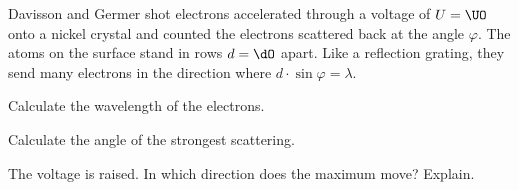 Davisson and Germer shot electrons accelerated through a voltage of $U = \UO$ onto a nickel crystal and counted the electrons scattered back at the angle $\varphi$. The atoms on the surface stand in rows $d = \dO$ apart. Like a reflection grating, they send many electrons in the direction where $d\cdot\sin\varphi = \lambda$.

\begin{abcliste}
\abc Calculate the wavelength of the electrons.

\abc Calculate the angle of the strongest scattering.

\abc The voltage is raised. In which direction does the maximum move? Explain.
\end{abcliste}
